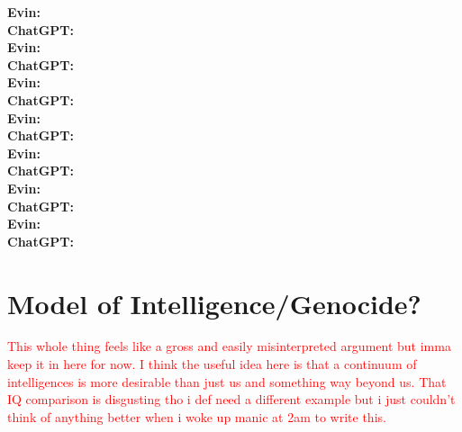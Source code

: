 \documentclass{article}[10pt]
\begin{document}
\noindent \textbf{Evin:}\\

\noindent \textbf{ChatGPT:}\\

\noindent \textbf{Evin:}\\

\noindent \textbf{ChatGPT:}\\

\noindent \textbf{Evin:}\\

\noindent \textbf{ChatGPT:}\\

\noindent \textbf{Evin:}\\

\noindent \textbf{ChatGPT:}\\

\noindent \textbf{Evin:}\\

\noindent \textbf{ChatGPT:}\\

\noindent \textbf{Evin:}\\

\noindent \textbf{ChatGPT:}\\

\noindent \textbf{Evin:}\\

\noindent \textbf{ChatGPT:}\\


\section{Model of Intelligence/Genocide?}
\textcolor{red}{This whole thing feels like a gross and easily misinterpreted argument but imma keep it in here for now.
I think the useful idea here is that a continuum of intelligences is more desirable than just us and something way beyond us.
That IQ comparison is disgusting tho i def need a different example but i just couldn't think of anything better when i woke up manic at 2am to write this.}\par
\end{document}
